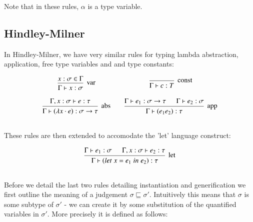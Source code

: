 \begin{appendices}
Note that in these rules, $\alpha$ is a type variable.

\subsection {Hindley-Milner}
\label{appendix:HMrules}

In Hindley-Milner, we have very similar rules for typing lambda
abstraction, application, free type variables and and type constants:

\[\begin{array}{c@{\qquad}c}  
    \mbox{\begin{prooftree}
      \hypo{x : \sigma \in \Gamma}
      \infer1[var]{\Gamma \vdash x : \sigma}
    \end{prooftree}}
    &
    \mbox{\begin{prooftree}
      \infer0[const]{\Gamma \vdash c : T}
    \end{prooftree}}
    \\\\
    \mbox{\begin{prooftree}
      \hypo{\Gamma , x : \sigma \vdash e : \tau }
      \infer1[abs]{\Gamma \vdash (\lambda x \cdot e) : \sigma \to \tau}
    \end{prooftree}}
    &
    \mbox{\begin{prooftree}
      \hypo{\Gamma \vdash e_1 : \sigma \to \tau}
      \hypo{\Gamma \vdash e_2 : \sigma}
      \infer2[app]{\Gamma \vdash (e_1 e_2) : \tau}
    \end{prooftree}}
    \\\\      
\end{array} \]

These rules are then extended to accomodate the 'let' language
construct:

  \[\begin{array}{c}  
    \mbox{\begin{prooftree}
      \hypo{\Gamma \vdash e_1 : \sigma}
      \hypo{\Gamma, x : \sigma \vdash e_2 : \tau }
      \infer2[let]{\Gamma \vdash (let\; x = e_1\; in\; e_2) : \tau}
    \end{prooftree}}
    \\\\
  \end{array} \]

Before we detail the last two rules detailing instantiation and
generification we first outline the meaning of a judgement $\sigma
\sqsubseteq \sigma'$. Intuitively this means that $\sigma$ is some
subtype of $\sigma'$ - we can create it by some substitution of the
quantified variables in $\sigma'$. More precisely it is defined as
follows:


\end{appendices}
